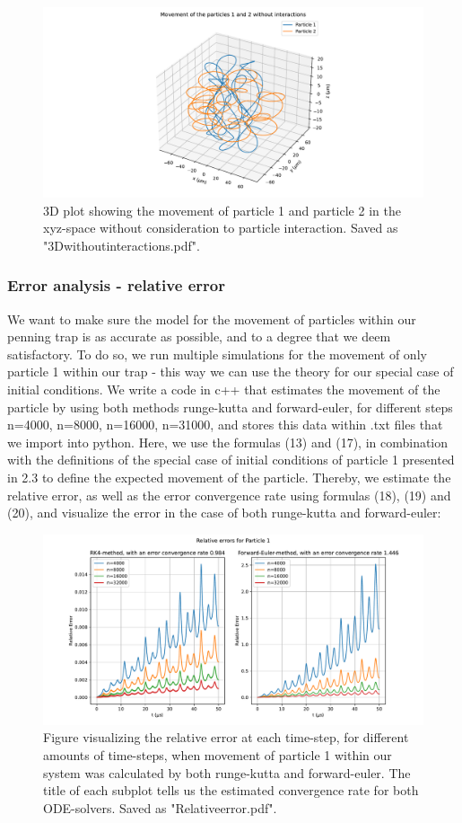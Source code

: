 \documentclass[english,notitlepage,reprint,nofootinbib,twocolumn]{article}
\begin{document}
\begin{figure}[H]
    \centering
    \includegraphics[width = .45\textwidth]{3Dwithoutinteractions.pdf} 
    \caption{3D plot showing the movement of particle 1 and particle 2 in the xyz-space without consideration to particle interaction. Saved as "3Dwithoutinteractions.pdf".}
    \label{fig: ee251}
\end{figure} 

\pagebreak
\subsubsection{Error analysis - relative error}
We want to make sure the model for the movement of particles within our penning trap is as accurate as possible, and to a degree that we deem satisfactory. To do so, we run multiple simulations for the movement of only particle 1 within our trap - this way we can use the theory for our special case of initial conditions. We write a code in c++ that estimates the movement of the particle by using both methods runge-kutta and forward-euler, for different steps n=4000, n=8000, n=16000, n=31000, and stores this data within .txt files that we import into python. Here, we use the formulas (13) and (17), in combination with the definitions of the special case of initial conditions of particle 1 presented in 2.3 to define the expected movement of the particle. Thereby, we estimate the relative error, as well as the error convergence rate using formulas (18), (19) and (20), and visualize the error in the case of both runge-kutta and forward-euler:
\begin{figure}[H]
    \centering
    \includegraphics[width = .45\textwidth]{Relativeerror.pdf} 
    \caption{Figure visualizing the relative error at each time-step, for different amounts of time-steps, when movement of particle 1 within our system was calculated by both runge-kutta and forward-euler. The title of each subplot tells us the estimated convergence rate for both ODE-solvers. Saved as "Relativeerror.pdf".}
    \label{fig: ee251}
\end{figure} 
\end{document}
